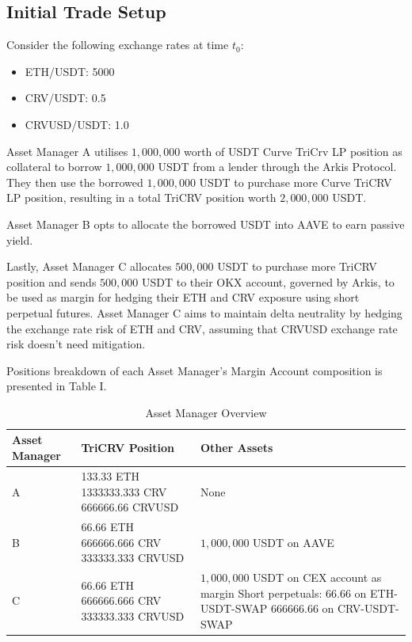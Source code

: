 \documentclass[conference]{IEEEtran}
\begin{document}
\subsection{Initial Trade Setup}
Consider the following exchange rates at time $t_{0}$:
\begin{itemize}
	\item ETH/USDT: 5000
	\item CRV/USDT: 0.5
	\item CRVUSD/USDT: 1.0
\end{itemize}

Asset Manager A utilises $1,000,000$ worth of USDT Curve TriCrv LP position as collateral to borrow $1,000,000$ USDT from a lender through the Arkis Protocol. They then use the borrowed $1,000,000$ USDT to purchase more Curve TriCRV LP position, resulting in a total TriCRV position worth $2,000,000$ USDT.

Asset Manager B opts to allocate the borrowed USDT into AAVE to earn passive yield. 

Lastly, Asset Manager C allocates $500,000$ USDT to purchase more TriCRV position and sends $500,000$ USDT to their OKX account, governed by Arkis, to be used as margin for hedging their ETH and CRV exposure using short perpetual futures. Asset Manager C aims to maintain delta neutrality by hedging the exchange rate risk of ETH and CRV, assuming that CRVUSD exchange rate risk doesn’t need mitigation.

Positions breakdown of each Asset Manager's Margin Account composition is presented in Table I.


\begin{table}[h]
\centering
\begin{tabular}{|p{1.5cm}|p{4.5cm}|p{8cm}|}
\hline
\textbf{Asset Manager} & \textbf{TriCRV Position} & \textbf{Other Assets} \\
\hline
A & 
\textbullet{} 133.33 ETH \newline
\textbullet{} 1333333.333 CRV \newline
\textbullet{} 666666.66 CRVUSD
& None \\
\hline
B & 
\textbullet{} 66.66 ETH \newline
\textbullet{} 666666.666 CRV \newline
\textbullet{} 333333.333 CRVUSD
& $1,000,000$ USDT on AAVE \\
\hline
C & 
\textbullet{} 66.66 ETH \newline
\textbullet{} 666666.666 CRV \newline
\textbullet{} 333333.333 CRVUSD
& \textbullet{} $1,000,000$ USDT on CEX account as margin \newline
\textbullet{} Short perpetuals: \newline
  \quad{} \textbullet{} 66.66 on ETH-USDT-SWAP \newline
  \quad{} \textbullet{} 666666.66 on CRV-USDT-SWAP \\
\hline
\end{tabular}
\caption{Asset Manager Overview}
\label{tab:asset-manager-overview}
\end{table}
\end{document}
